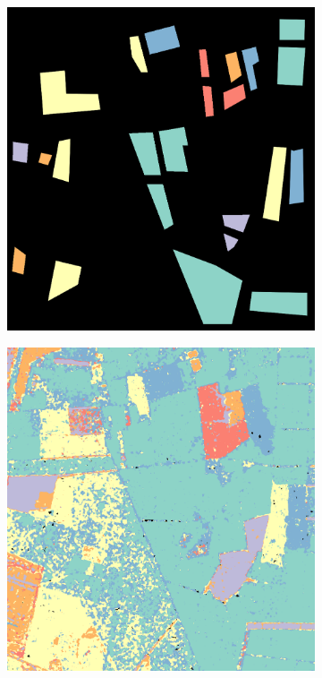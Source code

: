 \begin{figure}[tp]
	\centering
	\begin{subfigure}[b]{0.35\textwidth}
		\includegraphics[width=\textwidth]{Figures/Kron/Review/GT}
		\caption{}
		\label{fig:Training}
	\end{subfigure}
	\begin{subfigure}[b]{0.35\textwidth}
		\includegraphics[width=\textwidth]{Figures/Kron/Review/CL_raw_COLOUR_PR_0_185_1000_1050_MASK}

\end{subfigure}
\end{figure}
